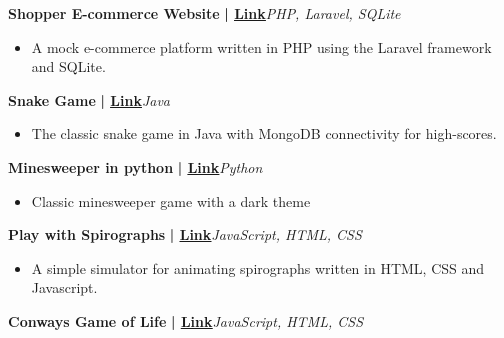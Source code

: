 \documentclass[a4paper]{article}
\begin{document}
        \vspace*{3mm}
      {\textbf{Shopper E-commerce Website}}\textbf{ | \href{https://github.com/syedhuzaif199/shopper}{\underline{Link}}}\hfill{\sl PHP, Laravel, SQLite}\\
          \vspace{-1mm}
\begin{itemize} \itemsep -3pt
\item[] A mock e-commerce platform written in PHP using the Laravel framework and SQLite.
\end{itemize}

          \vspace*{3mm}
      {\textbf{Snake Game}}\textbf{ | \href{https://github.com/syedhuzaif199/snake-mongo}{\underline{Link}}}\hfill{\sl Java}\\
          \vspace{-2mm}
\begin{itemize} \itemsep -3pt
\item[] The classic snake game in Java with MongoDB connectivity for high-scores.
\end{itemize}
          \vspace*{3mm}
      {\textbf{Minesweeper in python}}\textbf{ | \href{https://github.com/syedhuzaif199/minesweeper-python}{\underline{Link}}}\hfill{\sl Python}\\
          \vspace{-2mm}
\begin{itemize} \itemsep -3pt
\item[] Classic minesweeper game with a dark theme
\end{itemize}
          \vspace*{3mm}
      {\textbf{Play with Spirographs}}\textbf{ | \href{https://github.com/syedhuzaif199/play-with-spirographs}{\underline{Link}}}\hfill{\sl JavaScript, HTML, CSS}\\
          \vspace{-1mm}
\begin{itemize} \itemsep -3pt
\item[] A simple simulator for animating spirographs written in HTML, CSS and Javascript.
\end{itemize}
          \vspace*{3mm}
      {\textbf{Conway\textquotesingle{}s Game of Life}}\textbf{ | \href{https://github.com/syedhuzaif199/game-of-life}{\underline{Link}}}\hfill{\sl JavaScript, HTML, CSS}\\
          \vspace{-2mm}
\end{document}
